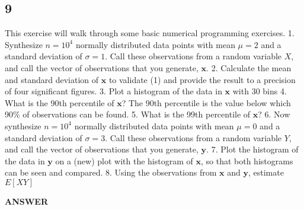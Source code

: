 \documentclass[11pt]{article}
\begin{document}
    \subsection{9}\label{section}

This exercise will walk through some basic numerical programming
exercises. 1. Synthesize \(n=10^4\) normally distributed data points
with mean \(\mu=2\) and a standard deviation of \(\sigma=1\). Call these
observations from a random variable \(X\), and call the vector of
observations that you generate, \(\textbf{x}\). 2. Calculate the mean
and standard deviation of \(\textbf{x}\) to validate (1) and provide the
result to a precision of four significant figures. 3. Plot a histogram
of the data in \(\textbf{x}\) with 30 bins 4. What is the 90th
percentile of \(\textbf{x}\)? The 90th percentile is the value below
which 90\% of observations can be found. 5. What is the 99th percentile
of \(\textbf{x}\)? 6. Now synthesize \(n=10^4\) normally distributed
data points with mean \(\mu=0\) and a standard deviation of
\(\sigma=3\). Call these observations from a random variable \(Y\), and
call the vector of observations that you generate, \(\textbf{y}\). 7.
Plot the histogram of the data in \(\textbf{y}\) on a (new) plot with
the histogram of \(\textbf{x}\), so that both histograms can be seen and
compared. 8. Using the observations from \(\textbf{x}\) and
\(\textbf{y}\), estimate \(E[XY]\)

    \textbf{ANSWER}
\end{document}
